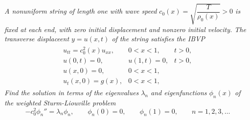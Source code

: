 \emph{A nonuniform string of length one with wave speed $c_0(x) = \sqrt{\dfrac{T}{\rho_0(x)}} > 0$ is fixed at each end, with zero initial displacement and nonzero initial velocity.  The transverse displaceent $y = u(x,t)$ of the string satisfies the IBVP}
\begin{align*}
    \begin{array}{lll}
        u_{tt} = c_0^2(x)u_{xx}, & 0 < x < 1, & t > 0, \\
        u(0, t) = 0, & u(1,t) = 0, & t > 0, \\
        u(x,0) = 0, & 0 < x < 1, & \\
        u_t(x,0) = g(x), & 0 < x < 1, &
    \end{array}
\end{align*}
\emph{Find the solution in terms of the eigenvalues $\lambda_n$ and eigenfunctions $\phi_n(x)$ of the weighted Sturm-Liouville problem $$-c_0^2\phi_n'' = \lambda_n\phi_n, \qquad \phi_n(0) = 0, \qquad \phi_n(1) = 0, \qquad n = 1, 2, 3, \dots$$}

